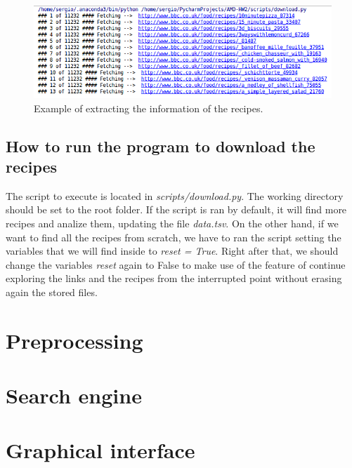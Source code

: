 \documentclass[paper=a4, fontsize=11pt]{scrartcl} %
\numberwithin{equation}{section} %
\numberwithin{figure}{section} %
\numberwithin{table}{section} %
\begin{document}
\begin{figure}[H]
\centering
\includegraphics[width=1\textwidth]{images/analyze}
\caption{Example of extracting the information of the recipes.}
\end{figure}

\subsection{How to run the program to download the recipes}

The script to execute is located in \textit{scripts/download.py}. The working directory should be set to the root folder. If the script is ran by default, it will find more recipes and analize them, updating the file \textit{data.tsv}. On the other hand, if we want to find all the recipes from scratch, we have to ran the script setting the variables that we will find inside to \textit{reset = True}. Right after that, we should change the variables \textit{reset} again to False to make use of the feature of continue exploring the links and the recipes from the interrupted point without erasing again the stored files.







\section{Preprocessing}
\section{Search engine}
\section{Graphical interface}
\end{document}
